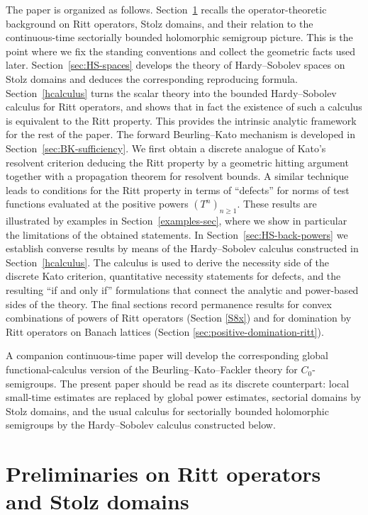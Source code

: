 \documentclass[11pt]{amsart}
\numberwithin{equation}{section}
\theoremstyle{definition}
\theoremstyle{plain}
\begin{document}
The paper is organized as follows. Section~\ref{sec:preliminaries} recalls the
operator-theoretic background on Ritt operators, Stolz domains, and their
relation to the continuous-time sectorially bounded holomorphic semigroup picture. This is
the point where we fix the standing conventions and collect the geometric facts
used later. Section~\ref{sec:HS-spaces} develops the theory of Hardy--Sobolev spaces on Stolz domains
and deduces the corresponding reproducing formula.  Section~\ref{hcalculus} turns the scalar theory into the bounded Hardy--Sobolev calculus for Ritt operators, and shows
 that in fact the existence of such a calculus is equivalent to the Ritt property. This
provides the intrinsic analytic framework for the rest of the paper. The
forward Beurling--Kato mechanism is developed in
Section~\ref{sec:BK-sufficiency}. We first obtain a discrete analogue of Kato's resolvent
criterion deducing the Ritt
property by a geometric hitting argument together with a propagation
theorem for resolvent bounds. A similar technique leads 
to conditions for the Ritt property in terms  of ``defects'' for norms of test functions
evaluated at the positive powers
$(T^n)_{n \ge 1}.$ These results are illustrated by examples in Section~\ref{examples-sec}, where
we show in particular the limitations of the obtained statements.
In Section~\ref{sec:HS-back-powers} we establish converse results by means of the Hardy--Sobolev calculus constructed in Section~\ref{hcalculus}.
The calculus is used to derive the necessity side of the discrete Kato criterion,
quantitative necessity statements for defects, and the resulting ``if and only
if'' formulations that connect the analytic and power-based sides of the
theory. The final sections record permanence results for convex combinations of powers of Ritt operators (Section \ref{S8x}) 
and for domination by Ritt operators on Banach lattices (Section \ref{sec:positive-domination-ritt}).

A companion continuous-time paper \cite{Borichev1} will develop the corresponding glo\-bal
functional-calculus version of the Beurling--Kato--Fackler theory for
$C_0$-semigroups. The present paper should be read as its discrete counterpart: local
small-time estimates are replaced by global power estimates, sectorial domains
by Stolz domains, and the usual calculus for sectorially bounded holomorphic semigroups by the
Hardy--Sobolev calculus constructed below.

\section{Preliminaries on Ritt operators and Stolz domains}\label{sec:preliminaries}
\end{document}
